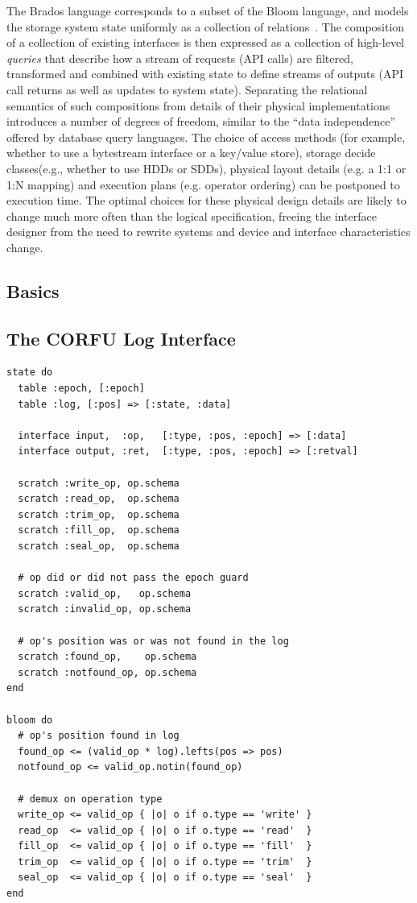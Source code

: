 \documentclass[10pt,twocolumn]{article}
\begin{document}
The Brados language corresponds to a subset of the Bloom language, and models the
storage system state uniformly as a collection of
relations~\cite{alvaro:cidr11}. The composition of a collection of existing
interfaces is then expressed as a collection of high-level \emph{queries} that
describe how a stream of requests (API calls) are filtered, transformed and
combined with existing state to define streams of outputs (API call returns as
well as updates to system state).  Separating the relational semantics of such
compositions from details of their physical implementations introduces a
number of degrees of freedom, similar to the ``data independence'' offered by
database query languages.  The choice of access methods (for example, whether
to use a bytestream interface or a key/value store), storage decide
classes(e.g., whether to use HDDs or SDDs), physical layout details (e.g. a
1:1 or 1:N mapping) and execution plans (e.g.  operator ordering) can be
postponed to execution time.  The optimal choices for these physical design
details are likely to change much more often than the logical specification,
freeing the interface designer from the need to rewrite systems and device and
interface characteristics change.  

\subsection{Basics}

\subsection{The CORFU Log Interface}

\begin{lstlisting}[caption={Epoch Guard}, label=lst:eg]
state do
  table :epoch, [:epoch]
  table :log, [:pos] => [:state, :data]

  interface input,  :op,   [:type, :pos, :epoch] => [:data]
  interface output, :ret,  [:type, :pos, :epoch] => [:retval]

  scratch :write_op, op.schema
  scratch :read_op,  op.schema
  scratch :trim_op,  op.schema
  scratch :fill_op,  op.schema
  scratch :seal_op,  op.schema

  # op did or did not pass the epoch guard
  scratch :valid_op,   op.schema
  scratch :invalid_op, op.schema

  # op's position was or was not found in the log
  scratch :found_op,    op.schema
  scratch :notfound_op, op.schema
end

bloom do
  # op's position found in log
  found_op <= (valid_op * log).lefts(pos => pos)
  notfound_op <= valid_op.notin(found_op)

  # demux on operation type
  write_op <= valid_op { |o| o if o.type == 'write' }
  read_op  <= valid_op { |o| o if o.type == 'read'  }
  fill_op  <= valid_op { |o| o if o.type == 'fill'  }
  trim_op  <= valid_op { |o| o if o.type == 'trim'  }
  seal_op  <= valid_op { |o| o if o.type == 'seal'  }
end
\end{lstlisting}
\end{document}
